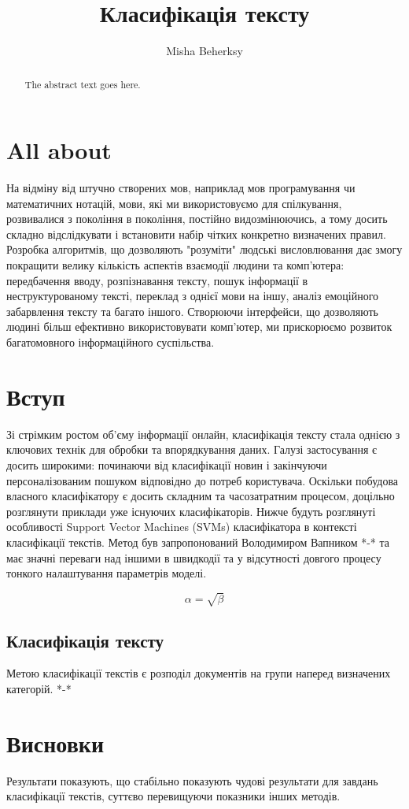 \documentclass[14pt]{article}
\begin{document}
\title{Класифікація тексту}
\author{Misha Beherksy}

\maketitle

\begin{abstract}
The abstract text goes here.
\end{abstract}

\section{All about}
На відміну від штучно створених мов, наприклад мов програмування чи математичних нотацій, 
мови, які ми використовуємо для спілкування, розвивалися з покоління в покоління, постійно 
видозмінюючись, а тому досить складно відслідкувати і встановити набір чітких конкретно
визначених правил. Розробка алгоритмів, що дозволяють "розуміти" людські висловлювання
дає змогу покращити велику кількість аспектів взаємодії людини та комп'ютера: передбачення
вводу, розпізнавання тексту, пошук інформації в неструктурованому тексті, переклад з однієї
мови на іншу, аналіз емоційного забарвлення тексту та багато іншого. Створюючи інтерфейси,
що дозволяють людині більш ефективно використовувати комп'ютер, ми прискорюємо 
розвиток багатомовного інформаційного суспільства.
\section{Вступ}
Зі стрімким ростом об'єму інформації онлайн, класифікація тексту стала однією з ключових
технік для обробки та впорядкування даних. Галузі застосування є досить широкими: 
починаючи від класифікації новин і закінчуючи персоналізованим пошуком відповідно до
потреб користувача. Оскільки побудова власного класифікатору є досить складним та
часозатратним процесом, доцільно розглянути приклади уже існуючих класифікаторів.
Нижче будуть розглянуті особливості  Support Vector Machines (SVMs) класифікатора в контексті класифікації текстів. Метод був запропонований Володимиром Вапником *-* та 
має значні переваги над іншими в швидкодії та у відсутності довгого процесу тонкого 
налаштування параметрів моделі.

\begin{equation}
    \label{simple_equation}
    \alpha = \sqrt{ \beta }
\end{equation}

\subsection{Класифікація тексту}
Метою класифікації текстів є розподіл документів на групи наперед визначених категорій. *-*


\section{Висновки}
Результати показують, що стабільно показують чудові результати для завдань класифікації
текстів, суттєво перевищуючи показники інших методів.
\end{document}
